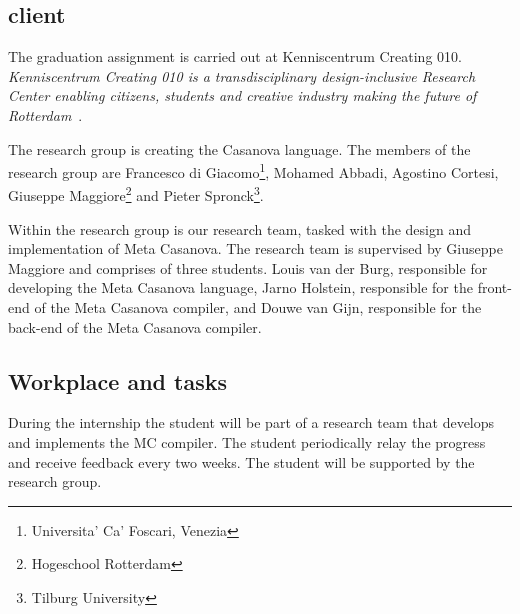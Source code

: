 \subsection{client}
The graduation assignment is carried out at Kenniscentrum Creating 010.
\textit{Kenniscentrum Creating 010 is a transdisciplinary design-inclusive Research Center enabling citizens, students and creative industry making the future of Rotterdam}~\cite{creating2016home}.

The research group is creating the Casanova language.
The members of the research group are 
  Francesco di Giacomo\footnote{\label{venice}Universita' Ca' Foscari, Venezia}, 
  Mohamed Abbadi, 
  Agostino Cortesi, 
  Giuseppe Maggiore\footnote{Hogeschool Rotterdam} and 
  Pieter Spronck\footnote{Tilburg University}.

Within the research group is our research team, tasked with the design and implementation of Meta Casanova.
The research team is supervised by Giuseppe Maggiore and comprises of three students.
Louis van der Burg, responsible for developing the Meta Casanova language,
Jarno Holstein, responsible for the front-end of the Meta Casanova compiler,
and Douwe van Gijn, responsible for the back-end of the Meta Casanova compiler.

\subsection{Workplace and tasks}
During the internship the student will be part of a research team that develops and implements the MC compiler.
The student periodically relay the progress and receive feedback every two weeks.
The student will be supported by the research group.

